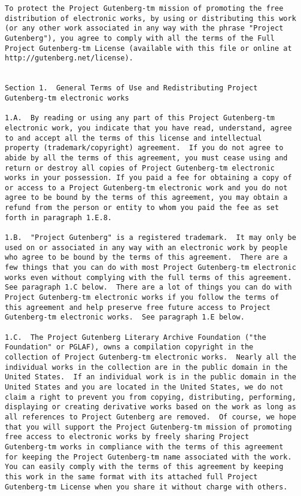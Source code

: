 \documentclass[oneside,12pt]{book}
\begin{document}
\begin{verbatim}
To protect the Project Gutenberg-tm mission of promoting the free
distribution of electronic works, by using or distributing this work
(or any other work associated in any way with the phrase "Project
Gutenberg"), you agree to comply with all the terms of the Full
Project Gutenberg-tm License (available with this file or online at
http://gutenberg.net/license).


Section 1.  General Terms of Use and Redistributing Project
Gutenberg-tm electronic works

1.A.  By reading or using any part of this Project Gutenberg-tm
electronic work, you indicate that you have read, understand, agree
to and accept all the terms of this license and intellectual
property (trademark/copyright) agreement.  If you do not agree to
abide by all the terms of this agreement, you must cease using and
return or destroy all copies of Project Gutenberg-tm electronic
works in your possession. If you paid a fee for obtaining a copy of
or access to a Project Gutenberg-tm electronic work and you do not
agree to be bound by the terms of this agreement, you may obtain a
refund from the person or entity to whom you paid the fee as set
forth in paragraph 1.E.8.

1.B.  "Project Gutenberg" is a registered trademark.  It may only be
used on or associated in any way with an electronic work by people
who agree to be bound by the terms of this agreement.  There are a
few things that you can do with most Project Gutenberg-tm electronic
works even without complying with the full terms of this agreement.
See paragraph 1.C below.  There are a lot of things you can do with
Project Gutenberg-tm electronic works if you follow the terms of
this agreement and help preserve free future access to Project
Gutenberg-tm electronic works.  See paragraph 1.E below.

1.C.  The Project Gutenberg Literary Archive Foundation ("the
Foundation" or PGLAF), owns a compilation copyright in the
collection of Project Gutenberg-tm electronic works.  Nearly all the
individual works in the collection are in the public domain in the
United States.  If an individual work is in the public domain in the
United States and you are located in the United States, we do not
claim a right to prevent you from copying, distributing, performing,
displaying or creating derivative works based on the work as long as
all references to Project Gutenberg are removed.  Of course, we hope
that you will support the Project Gutenberg-tm mission of promoting
free access to electronic works by freely sharing Project
Gutenberg-tm works in compliance with the terms of this agreement
for keeping the Project Gutenberg-tm name associated with the work.
You can easily comply with the terms of this agreement by keeping
this work in the same format with its attached full Project
Gutenberg-tm License when you share it without charge with others.


\end{verbatim}
\end{document}
